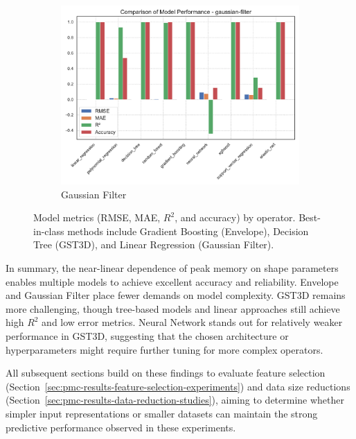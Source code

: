 \begin{figure}[htbp]
\begin{subfigure}[t]{0.32\textwidth}
        \includegraphics[width=\textwidth]{assets/images/05/performance_by_model_gaussian-filter}
        \caption{Gaussian Filter}
    \end{subfigure}
    \caption{Model metrics (\ac{RMSE}, \ac{MAE}, $R^2$, and accuracy) by operator.
    Best-in-class methods include Gradient Boosting (Envelope), Decision Tree (\ac{GST3D}), and Linear Regression (Gaussian Filter).}
    \label{fig:performance_by_model_operators}
\end{figure}

In summary, the near-linear dependence of peak memory on shape parameters enables multiple models to achieve excellent accuracy and reliability.
Envelope and Gaussian Filter place fewer demands on model complexity.
\ac{GST3D} remains more challenging, though tree-based models and linear approaches still achieve high $R^2$ and low error metrics.
Neural Network stands out for relatively weaker performance in \ac{GST3D}, suggesting that the chosen architecture or hyperparameters might require further tuning for more complex operators.

All subsequent sections build on these findings to evaluate feature selection (Section~\ref{sec:pmc-results-feature-selection-experiments}) and data size reductions (Section~\ref{sec:pmc-results-data-reduction-studies}), aiming to determine whether simpler input representations or smaller datasets can maintain the strong predictive performance observed in these experiments.